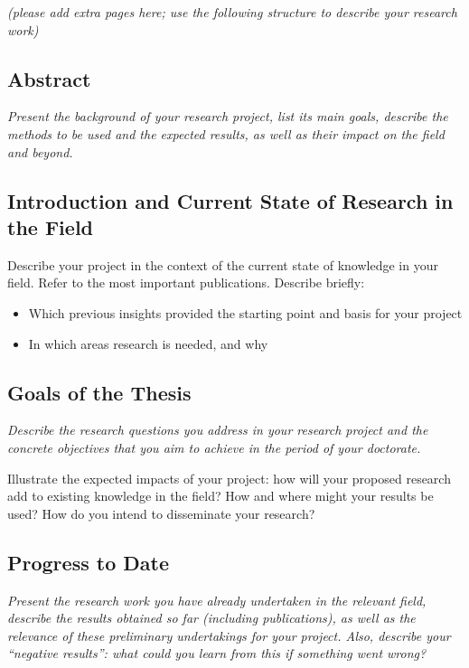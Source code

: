 \documentclass[11pt]{article}
\newcommand{\suggestion}[1]{{\itshape #1}}
\begin{document}
\suggestion{(please add extra pages here; use the following structure to describe your research work)}

\subsection{Abstract}
\suggestion{
Present the background of your research project, list its main goals, describe the methods to be used and the expected results, as well as their impact on the field and beyond.
\subsection{Introduction and Current State of Research in the Field}
Describe your project in the context of the current state of knowledge in your field.
Refer to the most important publications.
Describe briefly:
\begin{itemize}
    \item Which previous insights provided the starting point and basis for your project
    \item In which areas research is needed, and why
\end{itemize}
}

\subsection{Goals of the Thesis}
\suggestion{
Describe the research questions you address in your research project and the concrete objectives that you aim to achieve in the period of your doctorate.

Illustrate the expected impacts of your project: how will your proposed research add to existing knowledge in the field?
How and where might your results be used?
How do you intend to disseminate your research?
}

\subsection{Progress to Date}
\suggestion{
Present the research work you have already undertaken in the relevant field, describe the results obtained so far (including publications), as well as the relevance of these preliminary undertakings for your project.
Also, describe your “negative results”: what could you learn from this if something went wrong?
}
\end{document}
